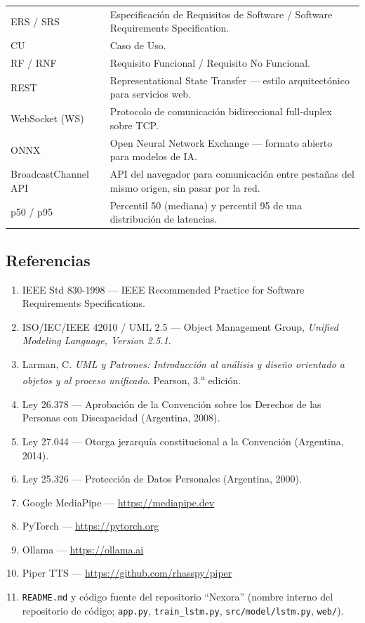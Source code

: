 \begin{longtable}{p{4cm} p{10cm}}
    ERS / SRS & Especificación de Requisitos de Software / Software Requirements Specification. \\
    CU & Caso de Uso. \\
    RF / RNF & Requisito Funcional / Requisito No Funcional. \\
    REST & Representational State Transfer --- estilo arquitectónico para servicios web. \\
    WebSocket (WS) & Protocolo de comunicación bidireccional full-duplex sobre TCP. \\
    ONNX & Open Neural Network Exchange --- formato abierto para modelos de IA. \\
    BroadcastChannel API & API del navegador para comunicación entre pestañas del mismo origen, sin pasar por la red. \\
    p50 / p95 & Percentil 50 (mediana) y percentil 95 de una distribución de latencias. \\
    \bottomrule
\end{longtable}

\subsection{Referencias}

\begin{enumerate}
    \item IEEE Std 830-1998 --- IEEE Recommended Practice for Software Requirements Specifications.
    \item ISO/IEC/IEEE 42010 / UML 2.5 --- Object Management Group, \textit{Unified Modeling Language, Version 2.5.1}.
    \item Larman, C. \textit{UML y Patrones: Introducción al análisis y diseño orientado a objetos y al proceso unificado}. Pearson, 3.\textsuperscript{a} edición.
    \item Ley 26.378 --- Aprobación de la Convención sobre los Derechos de las Personas con Discapacidad (Argentina, 2008).
    \item Ley 27.044 --- Otorga jerarquía constitucional a la Convención (Argentina, 2014).
    \item Ley 25.326 --- Protección de Datos Personales (Argentina, 2000).
    \item Google MediaPipe --- \url{https://mediapipe.dev}
    \item PyTorch --- \url{https://pytorch.org}
    \item Ollama --- \url{https://ollama.ai}
    \item Piper TTS --- \url{https://github.com/rhasspy/piper}
    \item \texttt{README.md} y código fuente del repositorio ``Nexora'' (nombre interno del repositorio de código; \texttt{app.py}, \texttt{train\_lstm.py}, \texttt{src/\allowbreak model/\allowbreak lstm.py}, \texttt{web/}).
\end{enumerate}

